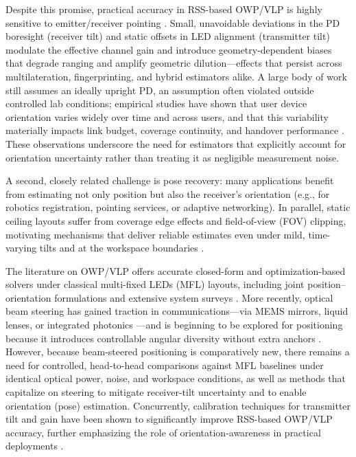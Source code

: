 \documentclass[conference]{IEEEtran}
\begin{document}
Despite this promise, practical accuracy in RSS-based OWP/VLP is highly sensitive to emitter/receiver pointing \cite{Chaudhary2021,Plets2019}. Small, unavoidable deviations in the PD boresight (receiver tilt) and static offsets in LED alignment (transmitter tilt) modulate the effective channel gain and introduce geometry-dependent biases that degrade ranging and amplify geometric dilution—effects that persist across multilateration, fingerprinting, and hybrid estimators alike. A large body of work still assumes an ideally upright PD, an assumption often violated outside controlled lab conditions; empirical studies have shown that user device orientation varies widely over time and across users, and that this variability materially impacts link budget, coverage continuity, and handover performance \cite{Soltani2019WCNC,Soltani2019}. These observations underscore the need for estimators that explicitly account for orientation uncertainty rather than treating it as negligible measurement noise.

A second, closely related challenge is pose recovery: many applications benefit from estimating not only position but also the receiver’s orientation (e.g., for robotics registration, pointing services, or adaptive networking). In parallel, static ceiling layouts suffer from coverage edge effects \cite{Acuna2025} and field-of-view (FOV) clipping, motivating mechanisms that deliver reliable estimates even under mild, time-varying tilts and at the  workspace boundaries \cite{Zhuang2018,Zhou2018}.

The literature on OWP/VLP offers accurate closed-form and optimization-based solvers under classical multi-fixed LEDs (MFL) layouts, including joint position–orientation formulations \cite{Zhou2018} and extensive system surveys \cite{Zhuang2018,Zhu2025}. More recently, optical beam steering has gained traction in communications—via MEMS mirrors, liquid lenses, or integrated photonics \cite{Kang2019,Kwon2024}—and is beginning to be explored for positioning because it introduces controllable angular diversity without extra anchors \cite{Chassagne2025}. However, because beam-steered positioning is comparatively new, there remains a need for controlled, head-to-head comparisons against MFL baselines under identical optical power, noise, and workspace conditions, as well as methods that capitalize on steering to mitigate receiver-tilt uncertainty and to enable orientation (pose) estimation. Concurrently, calibration techniques for transmitter tilt and gain have been shown to significantly improve RSS-based OWP/VLP accuracy, further emphasizing the role of orientation-awareness in practical deployments \cite{Wu2025}.
\end{document}
